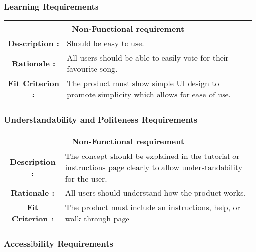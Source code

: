 \documentclass[12pt, titlepage]{article}
\begin{document}
\subsubsection{Learning Requirements}

\begin{center}
\begin{table}[H]
\begin{tabularx}{\textwidth}{| c X |}
\hline
\multicolumn{2}{|c|}{\textbf{Non-Functional requirement}}\\
\hline
\textbf{Description : } & Should be easy to use.\\
\hline
\textbf{Rationale : } & All users should be able to easily vote for their favourite song.\\
\hline
\textbf{Fit Criterion : } & The product must show simple UI design to promote simplicity which allows for ease of use.\\
\hline
\end{tabularx}
\end{table}
\end{center}

\subsubsection{Understandability and Politeness Requirements}

\begin{center}
\begin{table}[H]
\begin{tabularx}{\textwidth}{| c X |}
\hline
\multicolumn{2}{|c|}{\textbf{Non-Functional requirement}}\\
\hline
\textbf{Description : } & The concept should be explained in the tutorial or instructions page clearly to allow understandability for the user.\\
\hline
\textbf{Rationale : } & All users should understand how the product works.\\
\hline
\textbf{Fit Criterion : } & The product must include an instructions, help, or walk-through page.\\
\hline
\end{tabularx}
\end{table}
\end{center}

\subsubsection{Accessibility Requirements}
\end{document}

